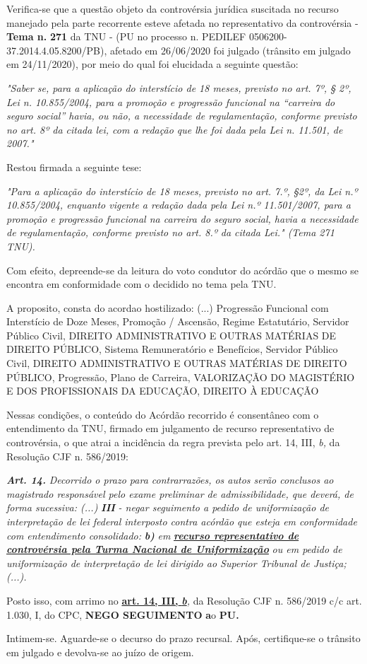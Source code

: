 \documentclass[12pt]{article}
\begin{document}
\justifying
\noindent Verifica-se que a questão objeto da controvérsia jurídica suscitada no recurso manejado pela parte recorrente esteve afetada no representativo da controvérsia - \textbf{Tema n. }\textbf{271} da TNU - (PU no processo n. PEDILEF 0506200-37.2014.4.05.8200/PB),  afetado em 26/06/2020 foi julgado (trânsito em julgado em 24/11/2020), por meio do qual foi elucidada a seguinte questão:

\noindent \textit{"Saber se, para a aplicação do interstício de 18 meses, previsto no art. 7º, § 2º, Lei n. 10.855/2004, para a promoção e progressão funcional na “carreira do seguro social” havia, ou não, a necessidade de regulamentação, conforme previsto no art. 8º da citada lei, com a redação que lhe foi dada pela Lei n. 11.501, de 2007."}

\noindent Restou firmada a seguinte tese:

\noindent \textit{"Para a aplicação do interstício de 18 meses, previsto no art. 7.º, §2º, da Lei n.º 10.855/2004, enquanto vigente a redação dada pela Lei n.º 11.501/2007, para a promoção e progressão funcional na carreira do seguro social, havia a necessidade de regulamentação, conforme previsto no art. 8.º da citada Lei." (Tema 271 TNU).}

\noindent Com efeito, depreende-se da leitura do voto condutor do acórdão que o mesmo se encontra em conformidade com o decidido no  tema pela TNU.

\noindent A proposito, consta do acordao hostilizado: (...) Progressão Funcional com Interstício de Doze Meses, Promoção / Ascensão, Regime Estatutário, Servidor Público Civil, DIREITO ADMINISTRATIVO E OUTRAS MATÉRIAS DE DIREITO PÚBLICO, Sistema Remuneratório e Benefícios, Servidor Público Civil, DIREITO ADMINISTRATIVO E OUTRAS MATÉRIAS DE DIREITO PÚBLICO, Progressão, Plano de Carreira, VALORIZAÇÃO DO MAGISTÉRIO E DOS PROFISSIONAIS DA EDUCAÇÃO, DIREITO À EDUCAÇÃO

\noindent Nessas condições, o conteúdo do Acórdão recorrido é consentâneo com o entendimento da TNU, firmado em julgamento de recurso representativo de controvérsia, o que atrai a incidência da regra prevista pelo art. 14, III, \textit{b,} da Resolução CJF n. 586/2019:

\noindent \textit{\textbf{Art. 14.}}\textit{ Decorrido o prazo para contrarrazões, os autos serão conclusos ao magistrado responsável pelo exame preliminar de admissibilidade, que deverá, de forma sucessiva: (...) }\textit{\textbf{III }}\textit{- negar seguimento a pedido de uniformização de interpretação de lei federal interposto contra acórdão que esteja em conformidade com entendimento consolidado: }\textit{\textbf{b)}}\textit{ em }\uline{\textit{\textbf{recurso representativo de controvérsia pela Turma Nacional de Uniformização}}}\textit{ ou em pedido de uniformização de interpretação de lei dirigido ao Superior Tribunal de Justiça;(...).}

\noindent Posto isso, com arrimo no \uline{\textbf{art. 14, III, }}\uline{\textit{\textbf{b}}}\textit{,} da Resolução CJF n. 586/2019 c/c art. 1.030, I, do CPC, \textbf{NEGO SEGUIMENTO }\textbf{a}o\textbf{ PU}\textbf{.}

\noindent Intimem-se. Aguarde-se o decurso do prazo recursal. Após, certifique-se o trânsito em julgado e devolva-se ao juízo de origem.
\end{document}
